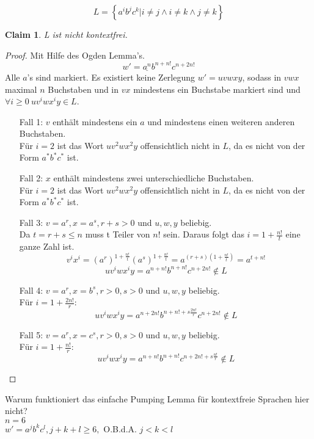 \documentclass[]{article}
\newtheorem{claim}[theorem]{Claim}
\begin{document}
$$L=\left\lbrace a^ib^jc^k|i\neq j \wedge i\neq k \wedge j\neq k \right\rbrace$$
\begin{claim}
L ist nicht kontextfrei.
\end{claim}
\begin{proof}
Mit Hilfe des Ogden Lemma's.
$$w'=\underline{a^n}b^{n+n!}c^{n+2n!}$$
Alle $a$'s sind markiert.
Es existiert keine Zerlegung $w'=uvwxy$, sodass in $vwx$ maximal $n$ Buchstaben und in $vx$ mindestens ein Buchstabe markiert sind und $\forall i\geq0\ uv^iwx^iy\in L$.
\begin{itemize}
\item[Fall 1:] $v$ enth\"alt mindestens ein $a$ und mindestens einen weiteren anderen Buchstaben.\\ 
F\"ur $i=2$ ist das Wort $uv^2wx^2y$ offensichtlich nicht in $L$, da es nicht von der Form $a^*b^*c^*$ ist.
\item[Fall 2:] $x$ enth\"alt mindestens zwei unterschiedliche Buchstaben.\\ 
F\"ur $i=2$ ist das Wort $uv^2wx^2y$ offensichtlich nicht in $L$, da es nicht von der Form $a^*b^*c^*$ ist.
\item[Fall 3:] $v=a^r,x=a^s,r+s>0$ und $u,w,y$ beliebig.\\
Da $t=r+s\leq n$ muss t Teiler von $n!$ sein.
Daraus folgt das $i=1+\frac{n!}{t}$ eine ganze Zahl ist. 
$$v^ix^i=(a^{r})^{1+\frac{n!}{t}}(a^{s})^{1+\frac{n!}{t}}=a^{(r+s)(1+\frac{n!}{t})}=a^{t+n!}$$
$$uv^iwx^iy=a^{n+n!}b^{n+n!}c^{n+2n!}\notin L$$
\item[Fall 4:] $v=a^r,x=b^s,r>0,s>0$ und $u,w,y$ beliebig.\\
F\"ur $i=1+\frac{2n!}{r}$:
$$uv^iwx^iy=a^{n+2n!}b^{n+n!+s\frac{2n!}{r}}c^{n+2n!}\notin L$$
\item[Fall 5:] $v=a^r,x=c^s,r>0,s>0$ und $u,w,y$ beliebig.\\
F\"ur $i=1+\frac{n!}{r}$:
$$uv^iwx^iy=a^{n+n!}b^{n+n!}c^{n+2n!+s\frac{n!}{r}}\notin L$$
\end{itemize}
\end{proof}
Warum funktioniert das einfache Pumping Lemma f\"ur kontextfreie Sprachen hier nicht?\\
$n=6$\\
$w'=a^jb^kc^l,j+k+l\geq6,$ O.B.d.A. $j<k<l$
\end{document}
